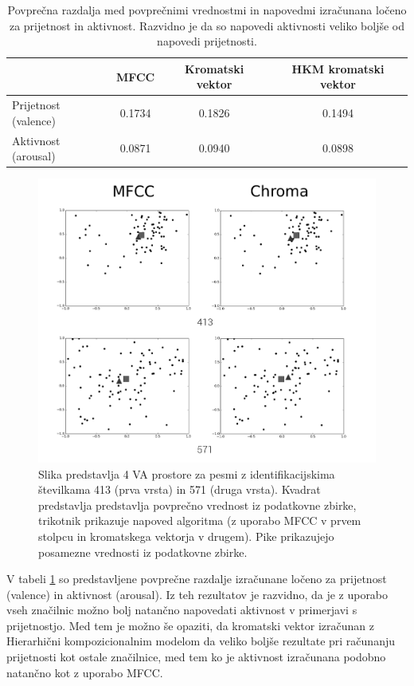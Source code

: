 \documentclass[a4paper, 12pt]{book}
\begin{document}
{\begin{table}[htb]
\begin{center}
\caption{Povprečna razdalja med povprečnimi vrednostmi in napovedmi izračunana ločeno za prijetnost in aktivnost. Razvidno je da so napovedi aktivnosti veliko boljše od napovedi prijetnosti. }
\begin{tabular}{|l|c|c|c|}
\hline
 & MFCC & Kromatski vektor & HKM kromatski vektor \\
\hline
Prijetnost (valence) & 0.1734 & 0.1826 & 0.1494\\
Aktivnost (arousal) & 0.0871 & 0.0940 & 0.0898\\
\hline
\end{tabular}
\label{seperateresults}
\end{center}
\end{table}

\begin{figure}[h!bt]
\centering
\includegraphics[width=130mm]{images/graphs1.png}
\caption{Slika predstavlja 4 VA prostore za pesmi z identifikacijskima številkama 413 (prva vrsta) in 571 (druga vrsta). Kvadrat predstavlja predstavlja povprečno vrednost iz podatkovne zbirke, trikotnik prikazuje napoved algoritma (z uporabo MFCC v prvem stolpcu in kromatskega vektorja v drugem). Pike prikazujejo posamezne vrednosti iz podatkovne zbirke.}
\label{graphs}
\end{figure}

V tabeli \ref{seperateresults} so predstavljene povprečne razdalje  izračunane ločeno za prijetnost (valence) in aktivnost (arousal). Iz teh rezultatov je razvidno, da je z uporabo vseh značilnic možno bolj natančno  napovedati aktivnost v primerjavi s prijetnostjo. Med tem je možno še opaziti, da kromatski vektor izračunan z Hierarhični kompozicionalnim modelom da veliko boljše rezultate pri računanju prijetnosti kot ostale značilnice, med tem ko je aktivnost izračunana podobno natančno kot z uporabo MFCC. 



}
\end{document}
